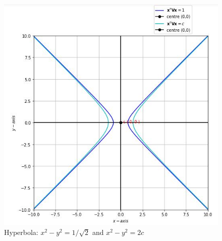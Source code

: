 \documentclass[journal,12pt,twocolumn]{IEEEtran}
\begin{document}
\begin{figure}[!htb]

	
	\includegraphics[width=\columnwidth]{Assignment5.jpg}
	
	\caption{Hyperbola: $x^2-y^2=1/\sqrt{2}$ and $x^2 - y^2=2c$}
	
	\label{fig:1}
	
\end{figure}
\end{document}
